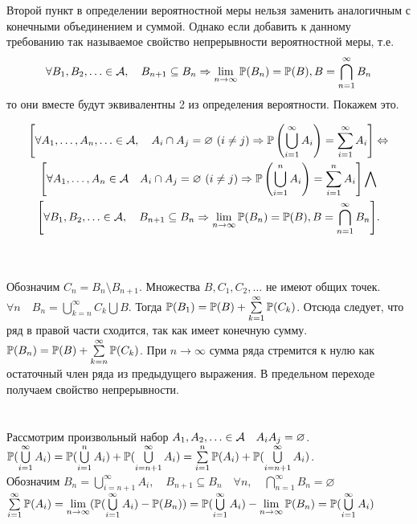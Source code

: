 \documentclass[../TV&MS.tex]{subfiles}
\begin{document}
Второй пункт в определении вероятностной меры нельзя заменить аналогичным с конечными 
объединением и суммой. Однако если добавить к данному требованию так называемое свойство 
непрерывности вероятностной меры, т.е.
$$
	\forall B_1, B_2, \ldots \in \mathcal{A}, \quad B_{n+1} \subseteq B_n 
	\Rightarrow \lim_{n \to \infty} \mathbb{P}(B_n) = \mathbb{P}(B), B = \bigcap_{n=1}^\infty B_n
$$
то они вместе будут эквивалентны 2 из определения вероятности. Покажем это.

\begin{St}
    \begin{multline*}
    \Biggl[\forall A_1, \dots, A_n, \ldots \in \mathcal{A}, \quad A_i \cap A_j  = \varnothing\  (i \neq j)
	\Rightarrow \mathbb{P}\left(\bigcup\limits_{i=1}^{\infty} A_i\right) = \sum\limits_{i = 1}^{\infty} 
    A_i\Biggr] \Leftrightarrow \\ \Biggl[ \forall A_1, \dots, A_n \in \mathcal{A} \quad A_i \cap A_j  = \varnothing\  
	(i \neq j)  \Rightarrow \mathbb{P}\left(\bigcup\limits_{i=1}^{n} A_i\right) = \sum\limits_{i = 1}^{n} 
    A_i \Biggr] \bigwedge \\ \Biggl[ \forall B_1, B_2, \ldots \in \mathcal{A}, \quad B_{n+1} \subseteq B_n 
	\Rightarrow \lim\limits_{n \to \infty} \mathbb{P}(B_n) = \mathbb{P}(B), 
	B = \displaystyle\bigcap_{n=1}^\infty B_n\Biggr].
    \end{multline*}
\end{St}
\begin{Proof}
\\ \fbox{$\Rightarrow$}\\
Обозначим $C_n = B_n \setminus B_{n+1}$. Множества $B, C_1, C_2, \ldots$ не имеют общих точек.\\
$\forall n \quad B_n =  \bigcup\limits_{k=n}^{\infty} C_k \bigcup B$. Тогда $\mathbb{P}(B_1) = \mathbb{P}(B) 
+ \sum\limits_{k=1}^{\infty} \mathbb{P}(C_k)$. Отсюда следует, что ряд в правой части сходится, так как 
имеет конечную сумму. $\mathbb{P}(B_n) = \mathbb{P}(B) + \sum\limits_{k=n}^{\infty} \mathbb{P}(C_k)$. При 
$n \to \infty$ сумма ряда стремится к нулю как остаточный член ряда из предыдущего выражения.
В предельном переходе получаем свойство непрерывности.
\\\\ \fbox{$\Leftarrow$}\\
Рассмотрим произвольный набор $A_1, A_2, \ldots \in \mathcal{A} \quad A_iA_j = \varnothing$.\\
$\mathbb{P}(\bigcup\limits_{i=1}^{\infty} A_i) = \mathbb{P}(\bigcup\limits_{i=1}^{n} A_i) + 
\mathbb{P}(\bigcup\limits_{i=n + 1}^{\infty} A_i) =\sum\limits_{i = 1}^{n} \mathbb{P}(A_i) +  
\mathbb{P}(\bigcup\limits_{i=n + 1}^{\infty} A_i) $.\\
Обозначим $B_n = \bigcup\limits_{i=n + 1}^{\infty} A_i,\quad B_{n+1} \subseteq B_n 
\quad \forall n,\quad \bigcap\limits_{n=1}^{\infty} B_n= \varnothing$ \\
$\sum\limits_{i=1}^{\infty} \mathbb{P}(A_i) = \lim\limits_{n \to \infty} 
(\mathbb{P}(\bigcup\limits_{i=1}^{\infty} A_i) - \mathbb{P}(B_n)) = \mathbb{P}(\bigcup\limits_{i=1}^{\infty} A_i) 
- \lim\limits_{n \to \infty} \mathbb{P}(B_n) = \mathbb{P}(\bigcup\limits_{i=1}^{\infty} A_i)$
\end{Proof}
\end{document}
